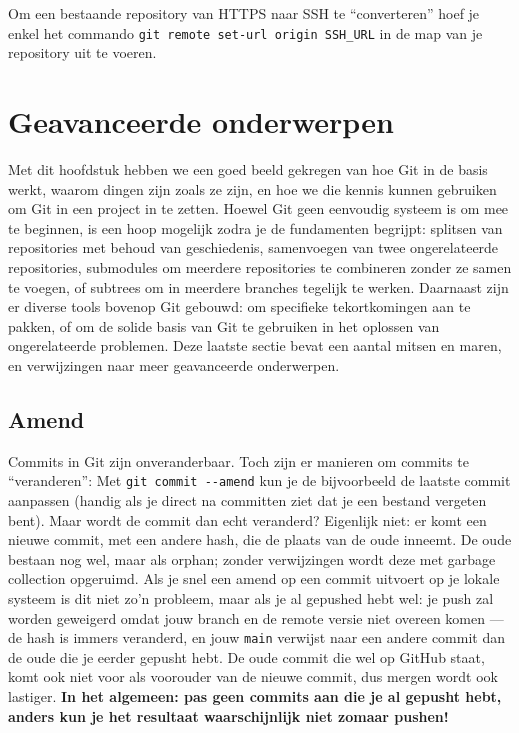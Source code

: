 Om een bestaande repository van HTTPS naar SSH te \enquote{converteren} hoef je enkel het commando \texttt{git remote set-url origin \lbrack SSH\_URL\rbrack} in de map van je repository uit te voeren.

\section{Geavanceerde onderwerpen}
Met dit hoofdstuk hebben we een goed beeld gekregen van hoe Git in de basis werkt, waarom dingen zijn zoals ze zijn, en hoe we die kennis kunnen gebruiken om Git in een project in te zetten. Hoewel Git geen eenvoudig systeem is om mee te beginnen, is een hoop mogelijk zodra je de fundamenten begrijpt: splitsen van repositories met behoud van geschiedenis, samenvoegen van twee ongerelateerde repositories, submodules om meerdere repositories te combineren zonder ze samen te voegen, of subtrees om in meerdere branches tegelijk te werken. Daarnaast zijn er diverse tools bovenop Git gebouwd: om specifieke tekortkomingen aan te pakken, of om de solide basis van Git te gebruiken in het oplossen van ongerelateerde problemen. Deze laatste sectie bevat een aantal mitsen en maren, en verwijzingen naar meer geavanceerde onderwerpen. 

\subsection{Amend} \label{sec:amend}
Commits in Git zijn onveranderbaar. Toch zijn er manieren om commits te \enquote{veranderen}: Met \texttt{git commit -\!-amend} kun je de bijvoorbeeld de laatste commit aanpassen (handig als je direct na committen ziet dat je een bestand vergeten bent). Maar wordt de commit dan echt veranderd? Eigenlijk niet: er komt een nieuwe commit, met een andere hash, die de plaats van de oude inneemt. De oude bestaan nog wel, maar als orphan; zonder verwijzingen wordt deze met garbage collection opgeruimd. Als je snel een amend op een commit uitvoert op je lokale systeem is dit niet zo'n probleem, maar als je al gepushed hebt wel: je push zal worden geweigerd omdat jouw branch en de remote versie niet overeen komen --- de hash is immers veranderd, en jouw \texttt{main} verwijst naar een andere commit dan de oude die je eerder gepusht hebt. De oude commit die wel op GitHub staat, komt ook niet voor als voorouder van de nieuwe commit, dus mergen wordt ook lastiger. \textbf{In het algemeen: pas geen commits aan die je al gepusht hebt, anders kun je het resultaat waarschijnlijk niet zomaar pushen!}

